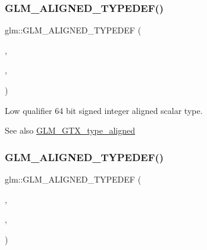 \subsubsection{\texorpdfstring{G\+L\+M\+\_\+\+A\+L\+I\+G\+N\+E\+D\+\_\+\+T\+Y\+P\+E\+D\+E\+F()}{GLM\_ALIGNED\_TYPEDEF()}\hspace{0.1cm}{\footnotesize\ttfamily [12/209]}}
{\footnotesize\ttfamily glm\+::\+G\+L\+M\+\_\+\+A\+L\+I\+G\+N\+E\+D\+\_\+\+T\+Y\+P\+E\+D\+EF (\begin{DoxyParamCaption}\item[{\mbox{\hyperlink{group__gtc__type__precision_ga1f4ded25f71c0f3b4518936d50b54b6e}{lowp\+\_\+i64}}}]{,  }\item[{aligned\+\_\+lowp\+\_\+i64}]{,  }\item[{8}]{ }\end{DoxyParamCaption})}

Low qualifier 64 bit signed integer aligned scalar type. \begin{DoxySeeAlso}{See also}
\mbox{\hyperlink{group__gtx__type__aligned}{G\+L\+M\+\_\+\+G\+T\+X\+\_\+type\+\_\+aligned}} 
\end{DoxySeeAlso}
\mbox{\label{group__gtx__type__aligned_gac8cff825951aeb54dd846037113c72db}} 
\subsubsection{\texorpdfstring{G\+L\+M\+\_\+\+A\+L\+I\+G\+N\+E\+D\+\_\+\+T\+Y\+P\+E\+D\+E\+F()}{GLM\_ALIGNED\_TYPEDEF()}\hspace{0.1cm}{\footnotesize\ttfamily [13/209]}}
{\footnotesize\ttfamily glm\+::\+G\+L\+M\+\_\+\+A\+L\+I\+G\+N\+E\+D\+\_\+\+T\+Y\+P\+E\+D\+EF (\begin{DoxyParamCaption}\item[{\mbox{\hyperlink{group__gtc__type__precision_ga3ee8faab2278c44c5785af04b7b18a14}{mediump\+\_\+int8}}}]{,  }\item[{aligned\+\_\+mediump\+\_\+int8}]{,  }\item[{1}]{ }\end{DoxyParamCaption})}

